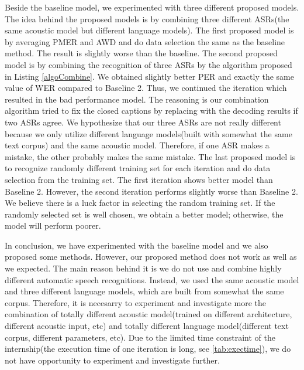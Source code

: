 Beside the baseline model, we experimented with three different proposed models. The idea behind the proposed models is by combining three different ASRs(the same acoustic model but different language models). The first proposed model is by averaging PMER and AWD and do data selection the same as the baseline method. The result is slightly worse than the baseline. The second proposed model is by combining the recognition of three ASRs by the algorithm proposed in Listing \ref{algoCombine}. We obtained slightly better PER and exactly the same value of WER compared to Baseline 2. Thus, we continued the iteration which resulted in the bad performance model. The reasoning is our combination algorithm tried to fix the closed captions by replacing with the decoding results if two ASRs agree. We hypothesize that our three ASRs are not really different because we only utilize different language models(built with somewhat the same text corpus) and the same acoustic model. Therefore, if one ASR makes a mistake, the other probably makes the same mistake. The last proposed model is to recognize  randomly different training set for each iteration and do data selection from the training set. The first iteration shows better model than Baseline 2. However, the second iteration performs slightly worse than Baseline 2. We believe there is a luck factor in selecting the random training set. If the randomly selected set is well chosen, we obtain a better model; otherwise, the model will perform poorer. 

In conclusion, we have experimented with the baseline model and we also proposed some methods. However, our proposed method does not work as well as we expected. The main reason behind it is we do not use and combine highly different automatic speech recognitions. Instead, we used the same acoustic model and three different language models, which are built from somewhat the same corpus. Therefore, it is necesarry to experiment and investigate more the combination of totally different acoustic model(trained on different architecture, different acoustic input, etc) and totally different language model(different text corpus, different parameters, etc). Due to the limited time constraint of the internship(the execution time of one iteration is long, see \ref{tab:exectime}), we do not have opportunity to experiment and investigate further.



